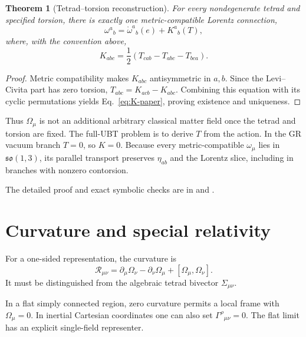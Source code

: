 \documentclass[12pt,a4paper]{article}
\newtheorem{theorem}[definition]{Theorem}
\theoremstyle{remark}\newtheorem{remark}[definition]{Remark}
\begin{document}
\begin{theorem}[Tetrad--torsion reconstruction]
For every nondegenerate tetrad and specified torsion, there is exactly one
metric-compatible Lorentz connection,
\begin{equation}
 \boxed{\omega^a{}_b=\mathring\omega^a{}_b(e)+K^a{}_b(T),}
 \label{eq:omega-torsion-paper}
\end{equation}
where, with the convention above,
\begin{equation}
 \boxed{
 K_{abc}=\frac12\left(T_{cab}-T_{abc}-T_{bca}\right).}
 \label{eq:K-paper}
\end{equation}
\end{theorem}

\begin{proof}
Metric compatibility makes $K_{abc}$ antisymmetric in $a,b$.  Since the
Levi--Civita part has zero torsion,
$T_{abc}=K_{acb}-K_{abc}$.  Combining this equation with its cyclic
permutations yields Eq.~\eqref{eq:K-paper}, proving existence and uniqueness.
\end{proof}

Thus $\Omega_\mu$ is not an additional arbitrary classical matter field once
the tetrad and torsion are fixed.  The full-UBT problem is to derive $T$ from
the action.  In the GR vacuum branch $T=0$, so $K=0$.  Because every
metric-compatible $\omega_\mu$ lies in $\mathfrak{so}(1,3)$, its parallel
transport preserves $\eta_{ab}$ and the Lorentz slice, including in branches
with nonzero contorsion.

The detailed proof and exact symbolic checks are in
 and
.

\section{Curvature and special relativity}
For a one-sided representation, the curvature is
\begin{equation}
 \mathcal R_{\mu\nu}
 =\partial_\mu\Omega_\nu-\partial_\nu\Omega_\mu
 +[\Omega_\mu,\Omega_\nu].
 \label{eq:curvature}
\end{equation}
It must be distinguished from the algebraic tetrad bivector
$\Sigma_{\mu\nu}$.

In a flat simply connected region, zero curvature permits a local frame with
$\Omega_\mu=0$.  In inertial Cartesian coordinates one can also set
$\Gamma^\rho{}_{\mu\nu}=0$.  The flat limit has an explicit single-field
representer.
\end{document}

